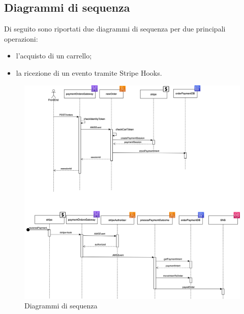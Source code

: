 \subsection{Diagrammi di sequenza}
Di seguito sono riportati due diagrammi di sequenza per due principali operazioni:
\begin{itemize}
	\item l'acquisto di un carrello;
	\item la ricezione di un evento tramite Stripe Hooks.
\end{itemize}
\begin{figure}[H]
	\centering
	\includegraphics[scale=0.5]{Immagini/Backend/Diagrammiseq.png}
	\caption{Diagrammi di sequenza}
	\label{fig:Diagrammiseq}
\end{figure}